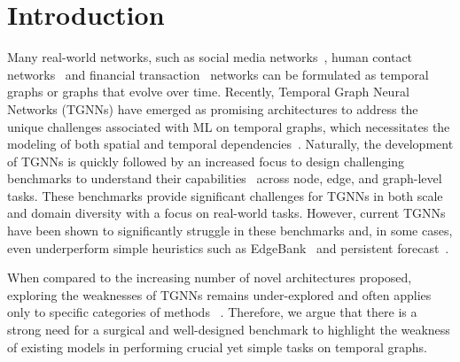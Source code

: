 

\section{Introduction}
 Many real-world networks, such as social media networks~\cite{tgb}, human contact networks~\cite{shirzadkhani2024static} and financial transaction~\cite{shamsi2024graphpulse} networks can be formulated as temporal graphs or graphs that evolve over time. Recently, Temporal Graph Neural Networks (TGNNs) have emerged as promising architectures to address the unique challenges associated with ML on temporal graphs, which necessitates the modeling of both spatial and temporal dependencies~\citep{tgn, tgat, dygformer, skarding_tg_survey, ctan, feng_tg_survey}. Naturally, the development of TGNNs is quickly followed by an increased focus to design challenging benchmarks to understand their capabilities~\citep{poursafaei2022betterevaluationdynamiclink, tgb, tgb2.0, tgb-seq, shirzadkhani2024towards} across node, edge, and graph-level tasks. These benchmarks provide significant challenges for TGNNs in both scale and domain diversity with a focus on real-world tasks. However, current TGNNs have been shown to significantly struggle in these benchmarks and, in some cases, even underperform simple heuristics such as EdgeBank~\citep{poursafaei2022betterevaluationdynamiclink} and persistent forecast~\citep{tgb}. 

 When compared to the increasing number of novel architectures proposed, exploring the weaknesses of TGNNs remains under-explored and often applies only to specific categories of methods~ \citep{pint, weisfeiler-go-dynamic, tjandra2024enhancingexpressivitytemporalgraph}. Therefore, we argue that there is a strong need for a surgical and well-designed benchmark to highlight the weakness of existing models in performing crucial yet simple tasks on temporal graphs.


